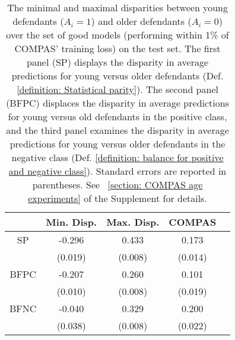 \documentclass{article}
\begin{document}
\begin{table}[htbp!]
\caption{The minimal and maximal disparities between young defendants ($A_i = 1$) and older defendants ($A_i = 0$) over the set of good models (performing within 1\% of COMPAS' training loss) on the test set. The first panel (SP) displays the disparity in average predictions for young versus older defendants (Def. \ref{definition: Statistical parity}). The second panel (BFPC) displaces the disparity in average predictions for young versus old defendants in the positive class, and the third panel examines the disparity in average predictions for young versus older defendants in the negative class (Def. \ref{definition: balance for positive and negative class}). Standard errors are reported in parentheses. See \textsection~\ref{section: COMPAS age experiments} of the Supplement for details.}
\label{table: Compas age ref model compas test}
\vskip 0.15in
\begin{center}
\begin{small}
\begin{sc}
\begin{tabular}{ccccr}
\toprule
& Min. Disp. & Max. Disp. & COMPAS \\
\midrule
SP & -0.296 & 0.433 & 0.173 \\ 
& (0.019) & (0.008) & (0.014) \\
\midrule 
BFPC & -0.207 & 0.260 & 0.101 \\ 
& (0.010) & (0.008) & (0.019) \\
\midrule
BFNC & -0.040 & 0.329 & 0.200 \\
& (0.038) & (0.008) & (0.022) \\
\bottomrule
\end{tabular}
\end{sc}
\end{small}
\end{center}
\vskip -0.1in
\end{table}
\end{document}
